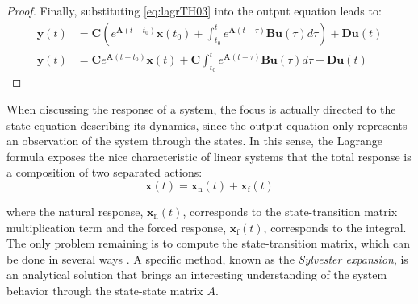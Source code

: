 \documentclass[a4paper,11pt]{book}
\numberwithin{figure}{chapter}
\numberwithin{equation}{chapter}
\numberwithin{table}{chapter}
\theoremstyle{definition}
\begin{document}
\begin{proof}
	Finally, substituting \eqref{eq:lagrTH03} into the output equation leads to:
	\begin{equation} \label{eq:lagrTH04}
	\begin{split}
	    \bm{y}(t) &= \bm{C} \left( e^{\bm{A} (t - t_0)} \bm{x}(t_0) + \int_{t_0}^{t} e^{\bm{A}(t - \tau)} \bm{B} \bm{u}(\tau) d\tau \right) + \bm{D} \bm{u}(t) \\ 
	    \bm{y}(t) &= \bm{C} e^{\bm{A}(t - t_0)} \bm{x}(t) + \bm{C} \int_{t_0}^{t} e^{\bm{A}(t - \tau)} \bm{B} \bm{u}(\tau) d \tau + \bm{D} \bm{u}(t) 
    \end{split}
	\end{equation}
\end{proof}

When discussing the response of a system, the focus is actually directed to the state equation describing its dynamics, since the output equation only represents an observation of the system through the states. In this sense, the Lagrange formula exposes the nice characteristic of linear systems that the total response is a composition of two separated actions:
\begin{equation}
    \bm{x}(t) = \bm{x}_{\text{n}}(t) + \bm{x}_{\text{f}}(t) 
\end{equation}

\noindent where the natural response, $\bm{x}_{\text{n}}(t)$, corresponds to the state-transition matrix multiplication term and the forced response, $\bm{x}_{\text{f}}(t)$, corresponds to the integral. The only problem remaining is to compute the state-transition matrix, which can be done in several ways \cite{Moler_VanLoan:2003}. A specific method, known as the \textit{Sylvester expansion}, is an analytical solution that brings an interesting understanding of the system behavior through the state-state matrix $A$.
\end{document}
